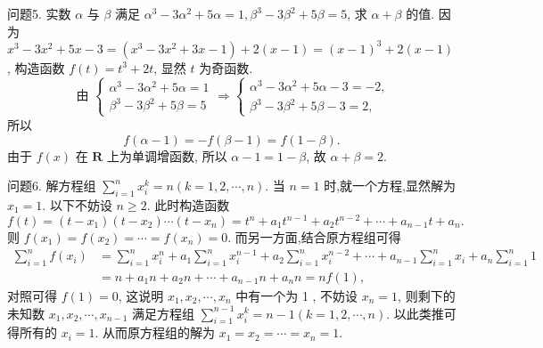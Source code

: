 问题5. 实数 $\alpha$ 与 $\beta$ 满足 $\alpha^3-3 \alpha^2+5 \alpha=1, \beta^3-3 \beta^2+5 \beta=5$, 求 $\alpha+\beta$ 的值.
因为 $x^3-3 x^2+5 x-3=\left(x^3-3 x^2+3 x-1\right)+2(x-1)=(x- 1)^3+2(x-1)$, 构造函数 $f(t)=t^3+2 t$, 显然 $t$ 为奇函数.
$$
\text { 由 }\left\{\begin{array} { l } 
{ \alpha ^ { 3 } - 3 \alpha ^ { 2 } + 5 \alpha = 1 } \\
{ \beta ^ { 3 } - 3 \beta ^ { 2 } + 5 \beta = 5 }
\end{array} \Rightarrow \left\{\begin{array}{l}
\alpha^3-3 \alpha^2+5 \alpha-3=-2, \\
\beta^3-3 \beta^2+5 \beta-3=2,
\end{array}\right.\right.
$$
所以
$$
f(\alpha-1)=-f(\beta-1)=f(1-\beta) .
$$
由于 $f(x)$ 在 $\mathbf{R}$ 上为单调增函数, 所以 $\alpha-1=1-\beta$, 故 $\alpha+\beta=2$.



问题6. 解方程组 $\sum_{i=1}^n x_i^k=n(k=1,2, \cdots, n)$.
当 $n=1$ 时,就一个方程,显然解为 $x_1=1$.
以下不妨设 $n \geqslant 2$. 此时构造函数
$$
f(t)=\left(t-x_1\right)\left(t-x_2\right) \cdots\left(t-x_n\right)=t^n+a_1 t^{n-1}+a_2 t^{n-2}+\cdots+a_{n-1} t+a_n .
$$
则 $f\left(x_1\right)=f\left(x_2\right)=\cdots=f\left(x_n\right)=0$. 而另一方面,结合原方程组可得
$$
\begin{aligned}
\sum_{i=1}^n f\left(x_i\right) & =\sum_{i=1}^n x_i^n+a_1 \sum_{i=1}^n x_i^{n-1}+a_2 \sum_{i=1}^n x_i^{n-2}+\cdots+a_{n-1} \sum_{i=1}^n x_i+a_n \sum_{i=1}^n 1 \\
& =n+a_1 n+a_2 n+\cdots+a_{n-1} n+a_n n=n f(1),
\end{aligned}
$$
对照可得 $f(1)=0$, 这说明 $x_1, x_2, \cdots, x_n$ 中有一个为 1 , 不妨设 $x_n=1$, 则剩下的未知数 $x_1, x_2, \cdots, x_{n-1}$ 满足方程组 $\sum_{i=1}^{n-1} x_i^k=n-1(k=1,2, \cdots, n)$. 以此类推可得所有的 $x_i=1$. 从而原方程组的解为 $x_1=x_2=\cdots=x_n=1$.



